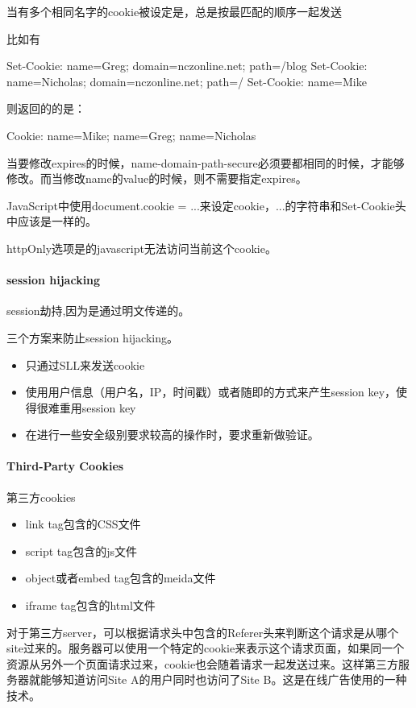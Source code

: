 当有多个相同名字的cookie被设定是，总是按最匹配的顺序一起发送

比如有
\begin{HTML5}
Set-Cookie: name=Greg; domain=nczonline.net; path=/blog
Set-Cookie: name=Nicholas; domain=nczonline.net; path=/
Set-Cookie: name=Mike
\end{HTML5}

则返回的的是：

\begin{HTML5}
Cookie: name=Mike; name=Greg; name=Nicholas
\end{HTML5}

当要修改expires的时候，name-domain-path-secure必须要都相同的时候，才能够修改。而当修改name的value的时候，则不需要指定expires。

JavaScript中使用document.cookie = ...来设定cookie，...的字符串和Set-Cookie头中应该是一样的。

httpOnly选项是的javascript无法访问当前这个cookie。


\paragraph{session hijacking} session劫持,因为是通过明文传递的。

三个方案来防止session hijacking。
\begin{itemize}

\item 只通过SLL来发送cookie
\item 使用用户信息（用户名，IP，时间戳）或者随即的方式来产生session key，使得很难重用session key
\item 在进行一些安全级别要求较高的操作时，要求重新做验证。
\end{itemize}

\paragraph{Third-Party Cookies} 第三方cookies

\begin{itemize}
\item link tag包含的CSS文件
\item script tag包含的js文件
\item object或者embed tag包含的meida文件
\item iframe tag包含的html文件
\end{itemize}

对于第三方server，可以根据请求头中包含的Referer头来判断这个请求是从哪个site过来的。服务器可以使用一个特定的cookie来表示这个请求页面，如果同一个资源从另外一个页面请求过来，cookie也会随着请求一起发送过来。这样第三方服务器就能够知道访问Site A的用户同时也访问了Site B。这是在线广告使用的一种技术。


